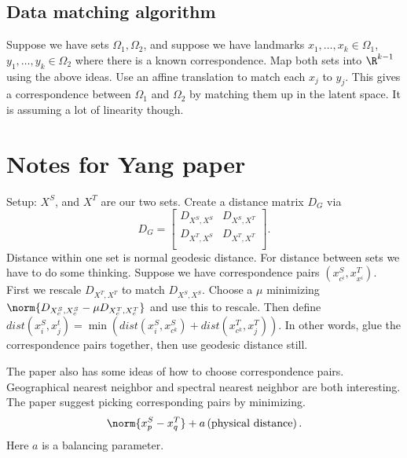 \documentclass{article}[11pt]
\begin{document}
\subsection{Data matching algorithm}
Suppose we have sets $\Omega_1,\Omega_2$, and suppose we have landmarks $x_1,\ldots,x_k\in\Omega_1$, $y_1,\ldots,y_k\in\Omega_2$ where there is a known correspondence. Map both sets into $\R^{k-1}$ using the above ideas. Use an affine translation to match each $x_j$ to $y_j$. This gives a correspondence between $\Omega_1$ and $\Omega_2$ by matching them up in the latent space. It is assuming a lot of linearity though.

\section{Notes for Yang paper \cite{Yang13}}

Setup: $X^S$, and $X^T$ are our two sets. Create a distance matrix $D_G$ via
\[D_G = \begin{bmatrix}
    D_{X^S,X^S} & D_{X^S,X^T} \\
    D_{X^T,X^S} & D_{X^T,X^T} \\
  \end{bmatrix}.\]
Distance within one set is normal geodesic distance. For distance between sets we have to do some thinking. Suppose we have correspondence pairs $(x^S_{c^i},x^T_{x^i})$. First we rescale $D_{X^T,X^T}$ to match $D_{X^S,X^S}$. Choose a $\mu$ minimizing $\norm{D_{X_c^S,X_c^S}-\mu D_{X_c^T,X_c^T}}$ and use this to rescale. Then define $dist(x_i^S,x_j^t) = \min(dist(x_i^S,x_{c^k}^S) + dist(x_{c^k}^T,x_j^T))$. In other words, glue the correspondence pairs together, then use geodesic distance still.

The paper also has some ideas of how to choose correspondence pairs. Geographical nearest neighbor and spectral nearest neighbor are both interesting. The paper suggest picking corresponding pairs by minimizing.
\[\norm{x_p^S - x_q^T} + a\left(\text{physical distance}\right).\]
Here $a$ is a balancing parameter.



\end{document}
